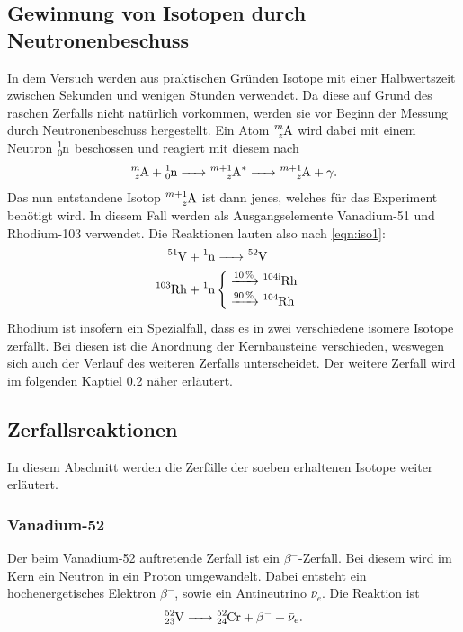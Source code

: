 \subsection{Gewinnung von Isotopen durch Neutronenbeschuss}
\label{sec:Neutronenbeschuss}
In dem Versuch werden aus praktischen Gründen Isotope mit einer Halbwertszeit zwischen Sekunden und 
wenigen Stunden verwendet. Da diese auf Grund des raschen Zerfalls nicht natürlich vorkommen, werden 
sie vor Beginn der Messung durch Neutronenbeschuss hergestellt. Ein Atom $\ce{^{m}_{z}A}$ wird dabei 
mit einem Neutron $\ce{^{1}_{0}n}$ beschossen und reagiert mit diesem nach
\begin{equation}
    \ce{^{m}_{z}A}+\ce{^{1}_{0}n -> ^{m + 1}_{z}A^* -> ^{m + 1}_{z}A}+\gamma.
    \label{eqn:iso1}
\end{equation}
Das nun entstandene Isotop $\ce{^{m + 1}_{z}A}$ ist dann jenes, welches für das Experiment benötigt
wird. In diesem Fall werden als Ausgangselemente Vanadium-51 und Rhodium-103 verwendet. Die 
Reaktionen lauten also nach \ref{eqn:iso1}:
\begin{align*}
    \ce{^{51}V}+\ce{^{1}n&->^{52}V}\\
    \ce{^{103}Rh}+\ce{^{1}n}&
    \begin{cases}
        \ce{->[10\%]^{104 i}Rh}\\
        \ce{->[90\%]^{104}Rh}
    \end{cases}
\end{align*}
Rhodium ist insofern ein Spezialfall, dass es in zwei verschiedene isomere Isotope zerfällt. Bei diesen
ist die Anordnung der Kernbausteine verschieden, weswegen sich auch der Verlauf des weiteren Zerfalls
unterscheidet. Der weitere Zerfall wird im folgenden Kaptiel \ref{sec:Zerfallsreaktionen} näher erläutert. 
\subsection{Zerfallsreaktionen}
\label{sec:Zerfallsreaktionen}
In diesem Abschnitt werden die Zerfälle der soeben erhaltenen Isotope weiter erläutert.
\subsubsection*{Vanadium-52} 
Der beim Vanadium-52 auftretende Zerfall ist ein $\beta^-$-Zerfall. Bei diesem wird im Kern ein Neutron
in ein Proton umgewandelt. Dabei entsteht ein hochenergetisches Elektron $\beta^-$, sowie ein 
Antineutrino $\bar{\nu}_e$. Die Reaktion ist
\begin{equation}
    \ce{^{52}_{23}V -> ^{52}_{24}Cr}+\beta^-+\bar{\nu}_e. 
    \label{eqn:VZerfall}
\end{equation}
